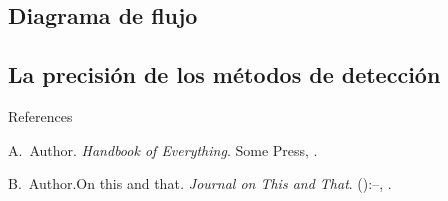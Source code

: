 \documentclass{beamer}
\begin{document}
\begin{frame}

\end{frame}

\subsection{Diagrama de flujo }

\begin{frame}

\end{frame}

\subsection{La precisión de los métodos de detección }

\begin{frame}
\end{frame}


\begin{frame}{References}
	\begin{thebibliography}{2}
		\beamertemplatebookbibitems
		A.\ Author. \newblock\emph{Handbook of Everything}.\newblock
\textlatin{Some Press, }.

		\beamertemplatearticlebibitems
		B.\ Author.\newblock On this and that\emph{.}
\newblock\emph{Journal on This and That}. 
():--, 
.
	\end{thebibliography}
\end{frame}

\end{document}
